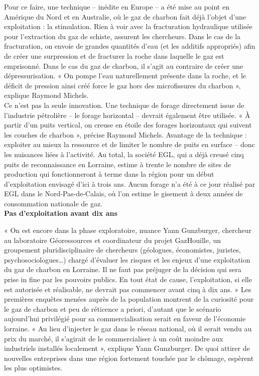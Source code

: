 \documentclass[8pt]{article}
\begin{document}
Pour ce faire, une technique – inédite en Europe – a été mise au point en Amérique du Nord et en Australie, où le gaz de charbon fait déjà l’objet d’une exploitation : la stimulation. Rien à voir avec la fracturation hydraulique utilisée pour l’extraction du gaz de schiste, assurent les chercheurs. Dans le cas de la fracturation, on envoie de grandes quantités d’eau (et les additifs appropriés) afin de créer une surpression et de fracturer la roche dans laquelle le gaz est emprisonné. Dans le cas du gaz de charbon, il s’agit au contraire de créer une dépressurisation. « On pompe l’eau naturellement présente dans la roche, et le déficit de pression ainsi créé force le gaz hors des microfissures du charbon », explique Raymond Michels.  \\


Ce n’est pas la seule innovation. Une technique de forage directement issue de l’industrie pétrolière – le forage horizontal – devrait également être utilisée. « À partir d’un puits vertical, on creuse en étoile des forages horizontaux qui suivent les couches de charbon », précise Raymond Michels. Avantage de la technique : exploiter au mieux la ressource et de limiter le nombre de puits en surface – donc les nuisances liées à l’activité. Au total, la société EGL, qui a déjà creusé cinq puits de reconnaissance en Lorraine, estime à trente le nombre de sites de production qui fonctionneront à terme dans la région pour un début d’exploitation envisagé d’ici à trois ans. Aucun forage n’a été à ce jour réalisé par EGL dans le Nord-Pas-de-Calais, où l’on estime le gisement à deux années de consommation nationale de gaz.  \\

\textbf{Pas d’exploitation avant dix ans}

« On est encore dans la phase exploratoire, nuance Yann Gunzburger, chercheur au laboratoire Géoressources et coordinateur du projet GazHouille, un groupement pluridisciplinaire de chercheurs (géologues, économistes, juristes, psychosociologues…) chargé d’évaluer les risques et les enjeux d’une exploitation du gaz de charbon en Lorraine. Il ne faut pas préjuger de la décision qui sera prise in fine par les pouvoirs publics. En tout état de cause, l’exploitation, si elle est autorisée et réalisable, ne devrait pas commencer avant cinq à dix ans. » Les premières enquêtes menées auprès de la population montrent de la curiosité pour le gaz de charbon et peu de réticence a priori, d’autant que le scénario aujourd’hui privilégié pour sa commercialisation serait en faveur de l’économie lorraine. « Au lieu d’injecter le gaz dans le réseau national, où il serait vendu au prix du marché, il s’agirait de le commercialiser à un coût moindre aux industriels installés localement », explique Yann Gunzburger. De quoi attirer de nouvelles entreprises dans une région fortement touchée par le chômage, espèrent les plus optimistes.
\end{document}
